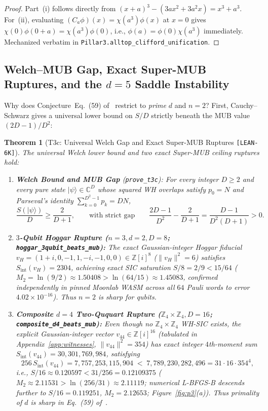 \documentclass[11pt,letterpaper]{article}
\theoremstyle{plain}
\newtheorem{theorem}{Theorem}[section]
\theoremstyle{definition}
\theoremstyle{remark}
\newcommand{\Z}{\mathbb{Z}}
\newcommand{\C}{\mathbb{C}}
\newcommand{\ket}[1]{\lvert #1 \rangle}
\newcommand{\norm}[1]{\lVert #1 \rVert}
\newcommand{\leanref}[1]{\textnormal{\texttt{\footnotesize #1}}}
\newcommand{\tagbadge}[1]{\textnormal{\texttt{\small [#1]}}}
\begin{document}
\begin{proof}
Part~(i) follows directly from $(x+a)^3-(3ax^2+3a^2x)=x^3+a^3$. For~(ii), evaluating $(C_a\phi)(x)=\chi(a^3)\phi(x)$ at $x=0$ gives $\chi(0)\phi(0+a)=\chi(a^3)\phi(0)$, i.e., $\phi(a)=\phi(0)\chi(a^3)$ immediately. Mechanized verbatim in \leanref{Pillar3.alltop\_clifford\_unification}.
\end{proof}

\subsection{Welch--MUB Gap, Exact Super-MUB Ruptures, and the \texorpdfstring{$d=5$}{d=5} Saddle Instability}

Why does Conjecture~Eq.~(59) of~\cite{Knipfer2026} restrict to \emph{prime} $d$ and $n=2$? First, Cauchy--Schwarz gives a universal lower bound on $S/D$ strictly beneath the MUB value $(2D-1)/D^2$:

\begin{theorem}[{T3c: Universal Welch Gap and Exact Super-MUB Ruptures \tagbadge{LEAN-6K}}]
\label{thm:t3c}
The universal Welch lower bound and two exact Super-MUB ceiling ruptures hold:
\begin{enumerate}[leftmargin=2em,itemsep=2pt]
  \item \textbf{Welch Bound and MUB Gap} (\leanref{prove\_t3c}): For every integer $D\ge 2$ and every pure state $\ket{\psi}\in\C^D$ whose squared WH overlaps satisfy $p_0=N$ and Parseval's identity $\sum_{k=0}^{D^2-1}p_k=DN$,
  \[
    \frac{S(\ket{\psi})}{D} \ge \frac{2}{D+1},
    \qquad\text{with strict gap}\qquad
    \frac{2D-1}{D^2} - \frac{2}{D+1} = \frac{D-1}{D^2(D+1)} > 0.
  \]
  \item \textbf{$3$-Qubit Hoggar Rupture ($n=3,d=2,D=8$; \leanref{hoggar\_3qubit\_beats\_mub}):} The exact Gaussian-integer Hoggar fiducial~\cite{Hoggar1998} $v_H=(1+i,0,-1,1,-i,-1,0,0)\in\Z[i]^8$ ($\norm{v_H}^2=6$) satisfies $S_{\mathrm{int}}(v_H)=2304$, achieving exact SIC saturation $S/8=2/9<15/64$ ($M_2=\ln(9/2)\approx 1.50408 > \ln(64/15)\approx 1.45083$, confirmed independently in pinned Moonlab WASM across all $64$ Pauli words to error $4.02\times 10^{-16}$). Thus $n=2$ is sharp for qubits.
  \item \textbf{Composite $d=4$ Two-Ququart Rupture ($\Z_4\times\Z_4, D=16$; \leanref{composite\_d4\_beats\_mub}):} Even though no $\Z_4\times\Z_4$ WH-SIC exists, the explicit Gaussian-integer vector $v_{44}\in\Z[i]^{16}$ (tabulated in Appendix~\ref{app:witnesses}, $\norm{v_{44}}^2=354$) has exact integer $4$th-moment sum $S_{\mathrm{int}}(v_{44})=30{,}301{,}769{,}984$, satisfying
  \[
    256\,S_{\mathrm{int}}(v_{44}) = 7{,}757{,}253{,}115{,}904 \;<\; 7{,}789{,}230{,}282{,}496 = 31\cdot 16\cdot 354^4,
  \]
  i.e., $S/16\approx 0.120597 < 31/256=0.12109375$ ($M_2\approx 2.11531 > \ln(256/31)\approx 2.11119$; numerical L-BFGS-B descends further to $S/16=0.119251$, $M_2=2.12653$; Figure~\ref{fig:p3}(a)). Thus primality of $d$ is sharp in Eq.~(59) of~\cite{Knipfer2026}.
\end{enumerate}
\end{theorem}
\end{document}

